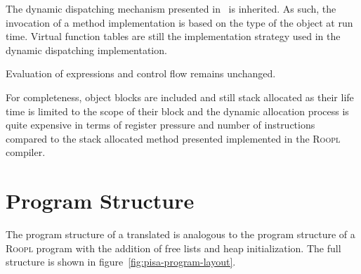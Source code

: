 The dynamic dispatching mechanism presented in~\cite{th:roopl} is inherited. As such, the invocation of a method implementation is based on the type of the object at run time. Virtual function tables are still the implementation strategy used in the dynamic dispatching implementation.

Evaluation of expressions and control flow remains unchanged. 

For completeness, object blocks are included and still stack allocated as their life time is limited to the scope of their block and the dynamic allocation process is quite expensive in terms of register pressure and number of instructions compared to the stack allocated method presented implemented in the \textsc{Roopl} compiler.


\section{Program Structure}
\label{sec:program-structure}
The program structure of a translated \rooplpp is analogous to the program structure of a \textsc{Roopl} program with the addition of free lists and heap initialization. The full structure is shown in figure~\ref{fig:pisa-program-layout}. 

